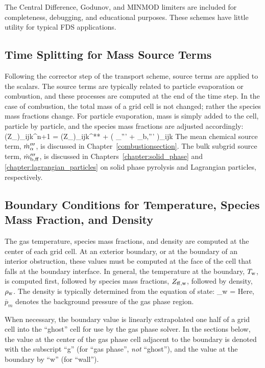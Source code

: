 The Central Difference, Godunov, and MINMOD limiters are included for completeness, debugging, and educational purposes.  These schemes have little utility for typical FDS applications.

\subsection{Time Splitting for Mass Source Terms}
\label{sec_time_splitting}

Following the corrector step of the transport scheme, source terms are applied to the scalars.  The source terms are typically related to particle evaporation or combustion, and these processes are computed at the end of the time step. In the case of combustion, the total mass of a grid cell is not changed; rather the species mass fractions change. For particle evaporation, mass is simply added to the cell, particle by particle, and the species mass fractions are adjusted accordingly:
\be \label{eq:mass_source_terms}
   (\rho Z_\alpha)_{ijk}^{n+1} = (\rho Z_\alpha)_{ijk}^{**} + \dt \left( \dm_{\alpha}''' + \dm_{\rm b,\alpha}''' \right)_{ijk}
\ee
The mean chemical source term, $\dot{m}_{\alpha}'''$, is discussed in Chapter~\ref{combustionsection}.  The bulk subgrid source term, $\dot{m}_{\rm b,\alpha}'''$, is discussed in Chapters~\ref{chapter:solid_phase} and \ref{chapter:lagrangian_particles} on solid phase pyrolysis and Lagrangian particles, respectively.


\subsection{Boundary Conditions for Temperature, Species Mass Fraction, and Density}
\label{section:TZD_bc}

The gas temperature, species mass fractions, and density are computed at the center of each grid cell. At an exterior boundary, or at
the boundary of an interior obstruction, these values must be computed at the face of the cell that falls at the boundary interface. In general, the temperature at the boundary, $T_{\rm w}$, is computed first, followed by species mass fractions, $Z_{\rm \alpha,w}$, followed by density, $\rho_{\rm w}$. The density is typically determined from the equation of state:
\be  \rho_{\rm w} =   \ee
Here, $\overline{p}_m$ denotes the background pressure of the gas phase region.

When necessary, the boundary value is linearly extrapolated one half of a grid cell into the ``ghost'' cell for use by the gas phase solver. In the sections below, the value at the center of the gas phase cell adjacent to the boundary is denoted with the subscript ``g'' (for ``gas phase'', \emph{not} ``ghost''), and the value at the boundary by ``w'' (for ``wall'').

